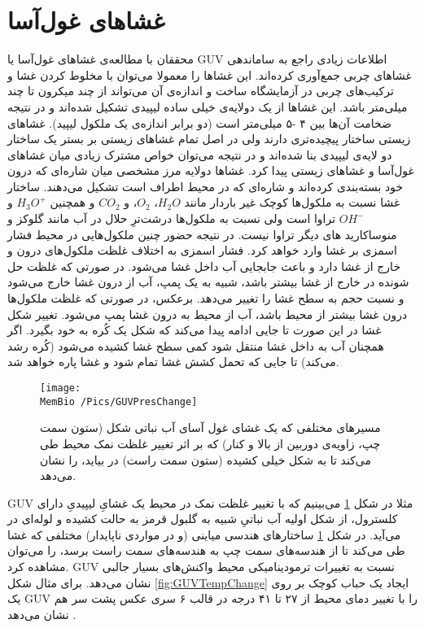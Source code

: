 \setRL
\section{
غشاهای غول‌آسا
}



محققان با مطالعه‌ی غشا‌های غول‌آسا
 یا 
 GUV اطلاعات  زیادی راجع به ساماندهی غشاهای چربی جمع‌آوری کرده‌اند. این غشا‌ها را معمولا می‌توان با  مخلوط کردن  
 غشا‌ و ترکیب‌های چربی در آزمایشگاه ساخت
 \cite{GUVmaking2009}
و اندازه‌ی آن می‌تواند از چند میکرون تا چند میلی‌متر   باشد.
این غشاها از یک دولایه‌ی خیلی ساده لیپیدی تشکیل شده‌اند و در نتیجه‌ ضخامت‌ آن‌ها بین ۴ -۵ میلی‌متر است (دو برابر اندازه‌ی یک ملکول لیپید). غشاهای زیستی ساختار پیچیده‌تری دارند ولی در اصل تمام‌ غشاهای زیستی بر بستر یک ساختار دو لایه‌ی لیپیدی بنا شده‌اند و در نتیجه می‌توان خواص مشترک زیادی میان غشا‌های غول‌آسا و غشاهای زیستی پیدا کرد.
غشاها دولایه مرز مشخصی میان شاره‌‌‌ای که درون خود بسته‌بندی کرده‌اند و شاره‌ای که در محیط اطراف است تشکیل می‌دهند. ساختار غشا نسبت به ملکول‌ها کوچک غیر باردار مانند 
$H_2O$، 
$O_2$،
و 
$CO_2$
و همچنین
$H_3O^+$
و
$OH^-$
تراوا است ولی نسبت به ملکول‌ها درشت‌ترِ حلال در آب مانند گلوکز
و منوساکارید‌
های دیگر تراوا نیست. در نتیجه‌ حضور چنین ملکول‌هایی در محیط فشار اسمزی بر غشا وارد خواهد کرد. فشار اسمزی به اختلاف غلظت ملکول‌های درون و خارج از غشا دارد و باعث جابجایی آب داخل غشا می‌شود. در صورتی که غلظت حل شونده در خارج از غشا بیشتر باشد، شبیه به یک پمپ، آب از درون غشا خارج می‌شود و نسبت حجم به سطح غشا را تغییر می‌دهد. برعکس، در صورتی که غلظت ملکول‌ها درون غشا بیشتر از محیط باشد، آب از محیط به درون غشا پمپ می‌شود. تغییر شکل غشا در این صورت تا جایی ادامه پیدا می‌کند که شکل یک کُره به خود بگیرد. اگر همچنان آب به داخل غشا منتقل شود کمی سطح غشا کشیده می‌شود (کُره رشد می‌کند) تا جایی که تحمل کشش غشا تمام شود و غشا پاره خواهد شد.




\begin{figure}[h]
\begin{center}
\texttt{[image: \\MemBio /Pics/GUVPresChange]}
\caption{
مسیر‌های مختلفی که یک غشای غول آسای آب نباتی شکل (ستون سمت چپ، زاویه‌ی دوربین از بالا و کنار) که بر اثر تغییر غلظت نمک محیط طی می‌کند تا به شکل خیلی کشیده (ستون سمت راست) در بیاید، را نشان می‌دهد.
}
\label{fig:GUVPresChange}
\end{center}
\end{figure}

GUV  مثلا در شکل 
\ref{fig:GUVPresChange}
می‌بینیم که با تغییر غلظت نمک در محیط یک غشایِ لیپیدیِ دارای کلسترول، از شکل اولیه آب نباتیِ  
شبیه‌ به گلبول قرمز به حالت کشیده و لوله‌ای در می‌آید. در شکل 
\ref{fig:GUVPresChange}
ساختار‌های هندسی میاینی (و در مواردی ناپایدار) مختلفی که غشا طی می‌کند تا از هندسه‌های سمت چپ به هندسه‌های سمت راست برسد، را می‌توان مشاهده کرد.
GUV نسبت به تغییرات ترمودینامیکی محیط واکنش‌های بسیار جالبی نشان می‌دهد. برای مثال شکل
\ref{fig:GUVTempChange}
ایجاد یک حباب کوچک بر روی یک GUV را با تغییر دمای محیط از ۲۷ تا ۴۱ درجه در قالب ۶ سری عکس پشت سر هم نشان می‌دهد
\cite{MemReviewRamakrishnan2014}.



 

 
 
 
 
 
 
 
 
 
 
 
 